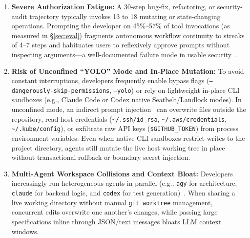 \documentclass[acmsmall,screen,review]{acmart}
\begin{document}
\begin{enumerate}
    \item \textbf{Severe Authorization Fatigue:} A 30-step bug-fix, refactoring, or security-audit trajectory typically invokes 13 to 18 mutating or state-changing operations. Prompting the developer on 45\%--57\% of tool invocations (as measured in \S\ref{sec:eval}) fragments autonomous workflow continuity to streaks of 4--7 steps and habituates users to reflexively approve prompts without inspecting arguments---a well-documented failure mode in usable security~\cite{felt2012android,akhawe2013alice}.
    \item \textbf{Risk of Unconfined ``YOLO'' Mode and In-Place Mutation:} To avoid constant interruptions, developers frequently enable bypass flags (\texttt{--dangerously-skip-permissions}, \texttt{--yolo}) or rely on lightweight in-place CLI sandboxes (e.g., Claude Code or Codex native Seatbelt/Landlock modes). In unconfined mode, an indirect prompt injection~\cite{greshake2023not,debenedetti2024agentdojo,zhan2024injecagent} can overwrite files outside the repository, read host credentials (\texttt{\textasciitilde/.ssh/id\_rsa}, \texttt{\textasciitilde/.aws/credentials}, \texttt{\textasciitilde/.kube/config}), or exfiltrate raw API keys (\texttt{\$GITHUB\_TOKEN}) from process environment variables. Even when native CLI sandboxes restrict writes to the project directory, agents still mutate the live host working tree in place without transactional rollback or boundary secret injection.
    \item \textbf{Multi-Agent Workspace Collisions and Context Bloat:} Developers increasingly run heterogeneous agents in parallel (e.g., \texttt{agy} for architecture, \texttt{claude} for backend logic, and \texttt{codex} for test generation)~\cite{wu2023autogen,hong2024metagpt}. When sharing a live working directory without manual \texttt{git worktree} management, concurrent edits overwrite one another's changes, while passing large specifications inline through JSON/text messages bloats LLM context windows.
\end{enumerate}
\end{document}
